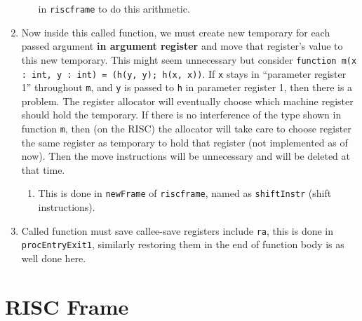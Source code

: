 \begin{enumerate}
\begin{enumerate}
    in
    \texttt{riscframe}
    to do this arithmetic.
  \end{enumerate}
\item
  Now inside this called function, we must create new temporary for each
  passed argument \textbf{in argument register} and move that register's
  value to this new temporary. This might seem unnecessary but consider
  \texttt{function m(x : int, y : int) = (h(y, y); h(x, x))}.
  If \texttt{x}
  stays in ``parameter register 1'' throughout
  \texttt{m},
  and \texttt{y}
  is passed to
  \texttt{h} in
  parameter register 1, then there is a problem. The register allocator
  will eventually choose which machine register should hold the
  temporary. If there is no interference of the type shown in function
  \texttt{m},
  then (on the RISC) the allocator will take care to choose register the
  same register as temporary to hold that register (not implemented as of now). Then the move
  instructions will be unnecessary and will be deleted at that time.

  \begin{enumerate}
  \def\labelenumii{\arabic{enumii}.}
  \item
    This is done in
    \texttt{newFrame}
    of
    \texttt{riscframe},
    named as
    \texttt{shiftInstr}
    (shift instructions).
  \end{enumerate}
\item
  Called function must save callee-save registers include
  \texttt{ra},
  this is done in
  \texttt{procEntryExit1},
  similarly restoring them in the end of function body is as well done
  here.
\end{enumerate}

\section{RISC Frame}

